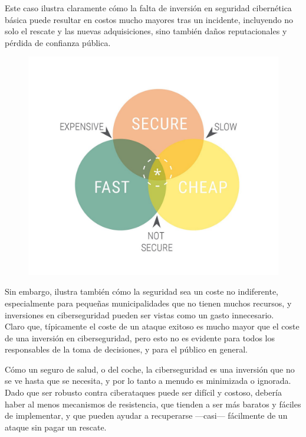 Este caso ilustra claramente cómo la falta de inversión en seguridad cibernética básica puede resultar en costos mucho mayores tras un incidente, incluyendo no solo el rescate y las nuevas adquisiciones, sino también daños reputacionales y pérdida de confianza pública.

\begin{paracol}{2}
    

    \colfill
    \begin{figure}[htbp]
        \centering
        \includegraphics[width=0.85\columnwidth]{images/FSC.jpg}
        \label{fig:FSC}
    \end{figure}
    \colfill
    
    \switchcolumn
    Sin embargo, ilustra también cómo la seguridad sea un coste no indiferente, especialmente para pequeñas municipalidades que no tienen muchos recursos, y inversiones en ciberseguridad pueden ser vistas como un gasto innecesario.\\
    Claro que, típicamente el coste de un ataque exitoso es mucho mayor que el coste de una inversión en ciberseguridad, pero esto no es evidente para todos los responsables de la toma de decisiones, y para el público en general.
    
    Cómo un seguro de salud, o del coche, la ciberseguridad es una inversión que no se ve hasta que se necesita, y por lo tanto a menudo es minimizada o ignorada.\\
    Dado que ser robusto contra ciberataques puede ser difícil y costoso, debería haber al menos mecanismos de resistencia, que tienden a ser más baratos y fáciles de implementar, y que pueden ayudar a recuperarse ---casi--- fácilmente de un ataque sin pagar un rescate.
    
\end{paracol}


